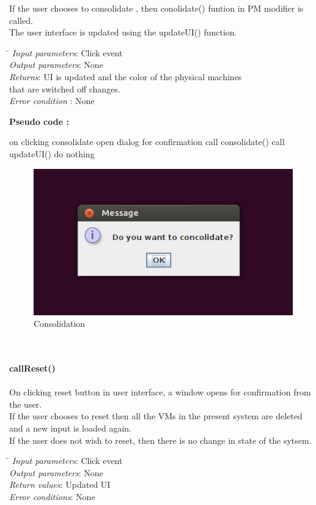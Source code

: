\documentclass{article}
\begin{document}
If the user chooses to consolidate ,  then conolidate() funtion in PM modifier is called.
\\ The user interface is updated using the updateUI() function.
\\
  \begin{tabbing}
  \hspace*{4cm}\= \kill
\emph{Input parameters}\>: Click event
\\
\emph{Output parameters}\>: None \\
\emph{Returns}\>: UI is updated and the color of the physical machines\\ \> that are switched off changes.\\
\emph{Error condition} \>: None\\
\end{tabbing}
\textbf{Pseudo code :}
\begin{algorithmic}[1]
\STATE on clicking consolidate
\STATE open dialog for confirmation
\STATE call consolidate()
\STATE call updateUI()
\ELSE 
\STATE do nothing
\ENDIF
\end{algorithmic}
\begin{figure}[ht!]
\centering
\includegraphics[scale=0.6, angle=0]{5.png}
\caption{Consolidation}
\end{figure} 
\mbox{}\\\\
\textbf{ callReset()}\\\\
On clicking reset button in user interface, a window opens for confirmation from the user.\\
If the user chooses to reset then all the VMs in the present system are deleted and  a new input is loaded again.\\
If the user does not wish to reset, then there is no change in  state of the sytsem. \\
  \begin{tabbing}
  \hspace*{4cm}\= \kill
\emph{Input parameters}\>: Click event \\
\emph{Output parameters}\>: None \\
\emph{Return values}\>: Updated UI\\
\emph{Error conditions}\>: None\\
\end{tabbing}
\end{document}
